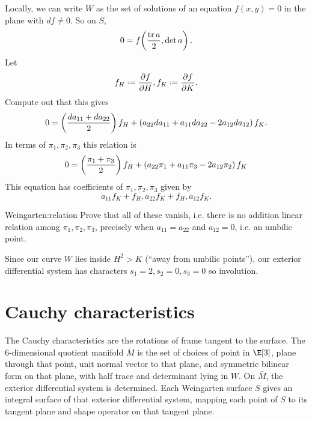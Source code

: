 Locally, we can write \(W\) as the set of solutions of an equation \(f(x,y)=0\) in the plane with \(df\ne 0\).
So on \(S\),
\[
0=f\!\left(\frac{\operatorname{tr} a}{2},\det a\right).
\]
Let 
\[
f_H \defeq \pderiv{f}{H}, f_K \defeq \pderiv{f}{K}.
\]
Compute out that this gives
\[
0 = 
\left(\frac{da_{11} + da_{22}}{2}\right) f_H
+
\left(a_{22} da_{11} + a_{11} da_{22} - 2 a_{12} da_{12} \right) f_K.
\]
In terms of \(\pi_1, \pi_2, \pi_3\) this relation is
\[
0=
\left(\frac{\pi_1 + \pi_3}{2}\right) f_H
+
\left(a_{22} \pi_1 + a_{11} \pi_3 - 2 a_{12} \pi_2 \right) f_K
\]
This equation has coefficients of \(\pi_1, \pi_2, \pi_3\) given by
\[
a_{11} f_K  + f_H,
a_{22} f_K  + f_H, 
a_{12} f_K.
\]
\begin{problem}{Weingarten:relation}
Prove that all of these vanish, i.e. there is no addition linear relation among \(\pi_1, \pi_2, \pi_3\), precisely when \(a_{11}=a_{22}\) and \(a_{12}=0\), i.e. an umbilic point. 
\end{problem}
Since our curve \(W\) lies inside \(H^2 > K\) (``away from umbilic points''), our exterior differential system has characters \(s_1=2, s_2=0, s_3=0\) so involution.

\section{Cauchy characteristics}
The Cauchy characteristics are the rotations of frame tangent to the surface.
The \(6\)-dimensional quotient manifold \(\bar{M}\) is the set of choices of point in \(\E[3]\), plane through that point, unit normal vector to that plane, and symmetric bilinear form on that plane, with half trace and determinant lying in \(W\).
On \(\bar{M}\), the exterior differential system is determined.
Each Weingarten surface \(S\) gives an integral surface of that exterior differential system, mapping each point of \(S\) to its tangent plane and shape operator on that tangent plane.


